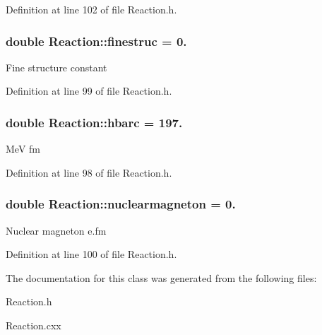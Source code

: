 Definition at line 102 of file Reaction.\-h.

\hypertarget{classReaction_ae5cded739cd4c1b07a79a850c3d83b21}{
\subsubsection[{finestruc}]{\setlength{\rightskip}{0pt plus 5cm}double Reaction\-::finestruc = 0.\hspace{0.3cm}{\ttfamily [static]}}}\label{classReaction_ae5cded739cd4c1b07a79a850c3d83b21}
Fine structure constant 

Definition at line 99 of file Reaction.\-h.

\hypertarget{classReaction_a7312a47fadc4fd628d408a672a7c1249}{
\subsubsection[{hbarc}]{\setlength{\rightskip}{0pt plus 5cm}double Reaction\-::hbarc = 197.\hspace{0.3cm}{\ttfamily [static]}}}\label{classReaction_a7312a47fadc4fd628d408a672a7c1249}
Me\-V fm 

Definition at line 98 of file Reaction.\-h.

\hypertarget{classReaction_adbeaf76ca988330f57ccf5479284c51d}{
\subsubsection[{nuclearmagneton}]{\setlength{\rightskip}{0pt plus 5cm}double Reaction\-::nuclearmagneton = 0.\hspace{0.3cm}{\ttfamily [static]}}}\label{classReaction_adbeaf76ca988330f57ccf5479284c51d}
Nuclear magneton e.\-fm 

Definition at line 100 of file Reaction.\-h.



The documentation for this class was generated from the following files\-:\begin{DoxyCompactItemize}
\item 
Reaction.\-h\item 
Reaction.\-cxx\end{DoxyCompactItemize}
